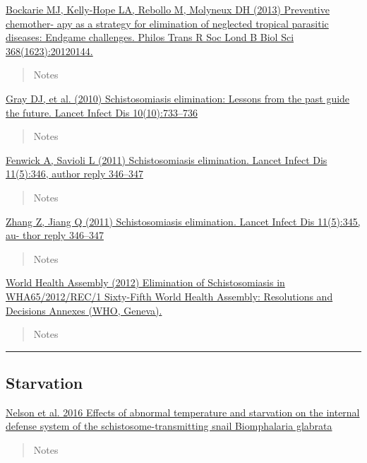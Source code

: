 \documentclass[10,portrait]{article}
\begin{document}
\href{}{Bockarie MJ, Kelly-Hope LA, Rebollo M, Molyneux DH (2013)
Preventive chemother- apy as a strategy for elimination of neglected
tropical parasitic diseases: Endgame challenges. Philos Trans R Soc Lond
B Biol Sci 368(1623):20120144.}

\begin{quote}
Notes
\end{quote}

\href{}{Gray DJ, et al. (2010) Schistosomiasis elimination: Lessons from
the past guide the future. Lancet Infect Dis 10(10):733--736}

\begin{quote}
Notes
\end{quote}

\href{}{Fenwick A, Savioli L (2011) Schistosomiasis elimination. Lancet
Infect Dis 11(5):346, author reply 346--347}

\begin{quote}
Notes
\end{quote}

\href{}{Zhang Z, Jiang Q (2011) Schistosomiasis elimination. Lancet
Infect Dis 11(5):345, au- thor reply 346--347}

\begin{quote}
Notes
\end{quote}

\href{}{World Health Assembly (2012) Elimination of Schistosomiasis in
WHA65/2012/REC/1 Sixty-Fifth World Health Assembly: Resolutions and
Decisions Annexes (WHO, Geneva).}

\begin{quote}
Notes
\end{quote}

\newpage  

\begin{center}\rule{0.5\linewidth}{\linethickness}\end{center}

\subsection{Starvation}\label{starvation}

\href{https://www.ncbi.nlm.nih.gov/pmc/articles/PMC4945359/}{Nelson et
al. 2016 Effects of abnormal temperature and starvation on the internal
defense system of the schistosome-transmitting snail Biomphalaria
glabrata}

\begin{quote}
Notes
\end{quote}
\end{document}
